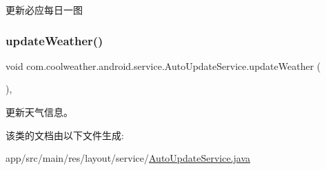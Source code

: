更新必应每日一图 \mbox{\label{classcom_1_1coolweather_1_1android_1_1service_1_1_auto_update_service_abdd2c17ca5780c0b8e9c763c2e195eea}} 
\subsubsection{\texorpdfstring{updateWeather()}{updateWeather()}}
{\footnotesize\ttfamily void com.\+coolweather.\+android.\+service.\+Auto\+Update\+Service.\+update\+Weather (\begin{DoxyParamCaption}{ }\end{DoxyParamCaption})\hspace{0.3cm}{\ttfamily [inline]}, {\ttfamily [private]}}

更新天气信息。 

该类的文档由以下文件生成\+:\begin{DoxyCompactItemize}
\item 
app/src/main/res/layout/service/\mbox{\hyperlink{res_2layout_2service_2_auto_update_service_8java}{Auto\+Update\+Service.\+java}}\end{DoxyCompactItemize}

